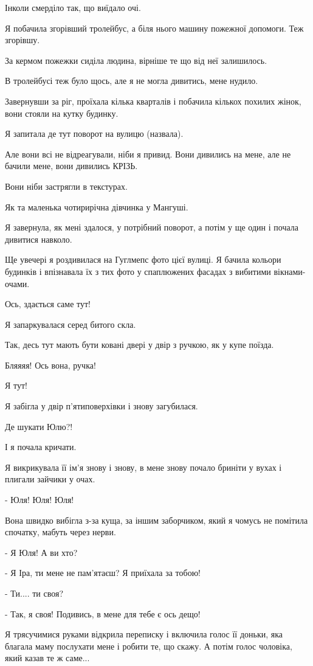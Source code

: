 Інколи смерділо так, що виїдало очі.

Я побачила згорівший тролейбус, а біля нього машину пожежної допомоги. Теж
згорівшу. 

За кермом пожежки сиділа людина, вірніше те що від неї залишилось.

В тролейбусі теж було щось, але я не могла дивитись, мене нудило.

Завернувши за ріг, проїхала кілька кварталів і побачила кількох похилих жінок,
вони стояли на кутку будинку.

Я запитала де тут поворот на вулицю (назвала).

Але вони всі не відреагували, ніби я привид. Вони дивились на мене, але не
бачили мене, вони дивились КРІЗЬ. 

Вони ніби застрягли в текстурах. 

Як та маленька чотирирічна дівчинка у Мангуші. 

Я завернула, як мені здалося, у потрібний поворот,  а потім у ще один і почала
дивитися навколо.

Ще увечері я роздивилася на Гуглмепс фото цієї вулиці. Я бачила кольори
будинків і впізнавала їх з тих фото у спаплюжених фасадах з вибитими
вікнами-очами. 

Ось, здається саме тут! 

Я запаркувалася серед битого  скла.

Так, десь тут мають бути ковані двері у двір з ручкою, як у купе поїзда.

Бляяяя! Ось вона, ручка! 

Я тут!

Я забігла у двір п'ятиповерхівки і знову загубилася. 

Де шукати Юлю?!

І я почала кричати.

Я викрикувала її ім'я знову і знову, в мене знову почало бриніти у вухах і
плигали зайчики у очах.

- Юля! Юля! Юля!

Вона швидко вибігла з-за куща, за іншим заборчиком, який я чомусь не помітила
спочатку, мабуть через нерви.

- Я Юля! А ви хто?

- Я Іра, ти мене не пам'ятаєш? Я приїхала за тобою! 

- Ти.... ти своя?

- Так, я своя! Подивись, в мене для тебе є ось дещо! 

Я трясучимися руками відкрила переписку і включила голос її доньки, яка благала
маму послухати мене і робити те, що скажу. А потім голос чоловіка, який казав
те ж саме... 

